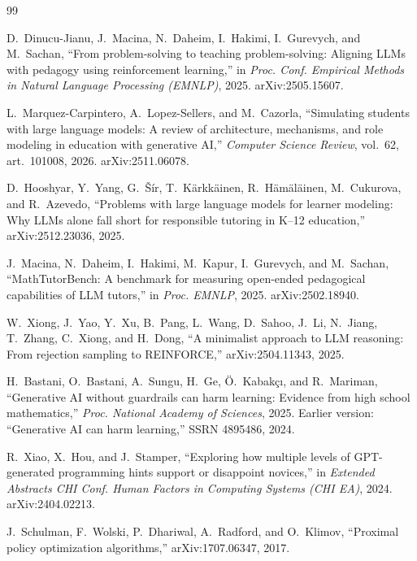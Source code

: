 \documentclass[conference]{IEEEtran}
\begin{document}
\begin{thebibliography}{99}

D.~Dinucu-Jianu, J.~Macina, N.~Daheim, I.~Hakimi, I.~Gurevych, and
M.~Sachan, ``From problem-solving to teaching problem-solving: Aligning LLMs
with pedagogy using reinforcement learning,'' in \emph{Proc. Conf. Empirical
Methods in Natural Language Processing (EMNLP)}, 2025. arXiv:2505.15607.

L.~Marquez-Carpintero, A.~Lopez-Sellers, and M.~Cazorla, ``Simulating students
with large language models: A review of architecture, mechanisms, and role
modeling in education with generative AI,'' \emph{Computer Science Review},
vol.~62, art.~101008, 2026. arXiv:2511.06078.

D.~Hooshyar, Y.~Yang, G.~\v{S}\'{i}r, T.~K\"{a}rkk\"{a}inen,
R.~H\"{a}m\"{a}l\"{a}inen, M.~Cukurova, and R.~Azevedo, ``Problems with
large language models for learner modeling: Why LLMs alone fall short for
responsible tutoring in K--12 education,'' arXiv:2512.23036, 2025.

J.~Macina, N.~Daheim, I.~Hakimi, M.~Kapur, I.~Gurevych, and M.~Sachan,
``MathTutorBench: A benchmark for measuring open-ended pedagogical
capabilities of LLM tutors,'' in \emph{Proc. EMNLP},
2025. arXiv:2502.18940.

W.~Xiong, J.~Yao, Y.~Xu, B.~Pang, L.~Wang, D.~Sahoo, J.~Li, N.~Jiang,
T.~Zhang, C.~Xiong, and H.~Dong, ``A minimalist approach to LLM reasoning:
From rejection sampling to REINFORCE,'' arXiv:2504.11343, 2025.

H.~Bastani, O.~Bastani, A.~Sungu, H.~Ge, \"{O}.~Kabak\c{c}{\i}, and
R.~Mariman, ``Generative AI without guardrails can harm learning: Evidence
from high school mathematics,'' \emph{Proc. National Academy of Sciences},
2025. Earlier version: ``Generative AI can harm learning,'' SSRN 4895486, 2024.

R.~Xiao, X.~Hou, and J.~Stamper, ``Exploring how multiple levels of
GPT-generated programming hints support or disappoint novices,'' in
\emph{Extended Abstracts CHI Conf. Human Factors in Computing Systems (CHI EA)},
2024. arXiv:2404.02213.

J.~Schulman, F.~Wolski, P.~Dhariwal, A.~Radford, and O.~Klimov,
``Proximal policy optimization algorithms,'' arXiv:1707.06347, 2017.


\end{thebibliography}
\end{document}
